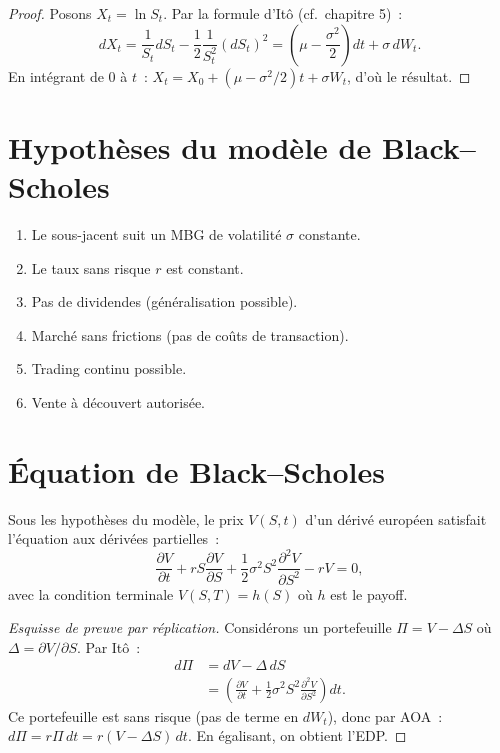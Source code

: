\begin{proof}
Posons $X_t = \ln S_t$. Par la formule d'It\^o (cf.\ chapitre 5)~:
\[
    dX_t = \frac{1}{S_t}dS_t - \frac{1}{2}\frac{1}{S_t^2}(dS_t)^2
         = \left(\mu - \frac{\sigma^2}{2}\right)dt + \sigma\, dW_t.
\]
En int\'egrant de $0$ \`a $t$~:
$X_t = X_0 + (\mu - \sigma^2/2)t + \sigma W_t$,
d'o\`u le r\'esultat.
\end{proof}

\section{Hypoth\`eses du mod\`ele de Black--Scholes}

\begin{attention}[title=\textbf{Hypoth\`eses fondamentales}]
\begin{enumerate}
    \item Le sous-jacent suit un MBG de volatilit\'e $\sigma$ constante.
    \item Le taux sans risque $r$ est constant.
    \item Pas de dividendes (g\'en\'eralisation possible).
    \item March\'e sans frictions (pas de co\^uts de transaction).
    \item Trading continu possible.
    \item Vente \`a d\'ecouvert autoris\'ee.
\end{enumerate}
\end{attention}

\section{\'Equation de Black--Scholes}

\begin{theoreme}
\label{thm:edp_bs}
Sous les hypoth\`eses du mod\`ele, le prix $V(S,t)$ d'un d\'eriv\'e
europ\'een satisfait l'\'equation aux d\'eriv\'ees partielles~:
\[
    \frac{\partial V}{\partial t} + rS\frac{\partial V}{\partial S}
    + \frac{1}{2}\sigma^2 S^2 \frac{\partial^2 V}{\partial S^2} - rV = 0,
\]
avec la condition terminale $V(S,T) = h(S)$ o\`u $h$ est le payoff.
\end{theoreme}

\begin{proof}[Esquisse de preuve par r\'eplication]
Consid\'erons un portefeuille $\Pi = V - \Delta S$ o\`u $\Delta =
\partial V/\partial S$. Par It\^o~:
\begin{align*}
    d\Pi &= dV - \Delta \, dS \\
         &= \left(\frac{\partial V}{\partial t}
            + \frac{1}{2}\sigma^2 S^2 \frac{\partial^2 V}{\partial S^2}\right)dt.
\end{align*}
Ce portefeuille est sans risque (pas de terme en $dW_t$), donc par AOA~:
$d\Pi = r\Pi\,dt = r(V - \Delta S)\,dt$.
En \'egalisant, on obtient l'EDP.
\end{proof}

